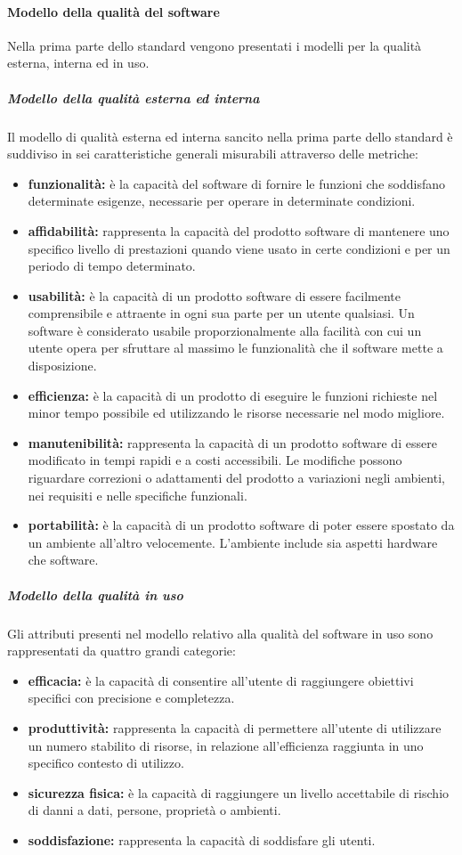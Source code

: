 			\paragraph{Modello della qualità del software}
			Nella prima parte dello standard vengono presentati i modelli per la qualità esterna, interna ed in uso.
				\subparagraph{Modello della qualità esterna ed interna}
				Il modello di qualità esterna ed interna sancito nella prima parte dello standard è suddiviso in sei caratteristiche generali misurabili attraverso delle metriche:
				\begin{itemize}
					\item \textbf{funzionalità:} è la capacità del software di fornire le funzioni che soddisfano determinate esigenze, necessarie per operare in determinate condizioni. 
					\item \textbf{affidabilità:} rappresenta la capacità del prodotto software di mantenere uno specifico livello di prestazioni quando viene usato in certe condizioni e per un periodo di tempo determinato.
					\item \textbf{usabilità:} è la capacità di un prodotto software di essere facilmente comprensibile e attraente in ogni sua parte per un utente qualsiasi. Un software è considerato usabile proporzionalmente alla facilità con cui un utente opera per sfruttare al massimo le funzionalità che il software mette a disposizione.
					\item \textbf{efficienza:} è la capacità di un prodotto di eseguire le funzioni richieste nel minor tempo possibile ed utilizzando le risorse necessarie nel modo migliore.
					\item \textbf{manutenibilità:} rappresenta la capacità di un prodotto software di essere modificato in tempi rapidi e a costi accessibili. Le modifiche possono riguardare correzioni o adattamenti del prodotto a variazioni negli ambienti, nei requisiti e nelle specifiche funzionali.
					\item \textbf{portabilità:} è la capacità di un prodotto software di poter essere spostato da un ambiente all'altro velocemente. L'ambiente include sia aspetti hardware che software.
				\end{itemize}
				
				\subparagraph{Modello della qualità in uso}
				Gli attributi presenti nel modello relativo alla qualità del software in uso sono rappresentati da quattro grandi categorie:
				\begin{itemize}
					\item \textbf{efficacia:} è la capacità di consentire all'utente di raggiungere obiettivi specifici con precisione e completezza.
					\item \textbf{produttività:} rappresenta la capacità di permettere all'utente di utilizzare un numero stabilito di risorse, in relazione all'efficienza raggiunta in uno specifico contesto di utilizzo.
					\item \textbf{sicurezza fisica:} è la capacità di raggiungere un livello accettabile di rischio di danni a dati, persone, proprietà o ambienti.
					\item \textbf{soddisfazione:} rappresenta la capacità di soddisfare gli utenti.
				\end{itemize}
